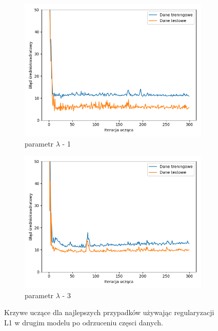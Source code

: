 \documentclass[12pt]{aghdpl}
\begin{document}
\begin{figure}[h]
		 	\begin{subfigure}{.5\linewidth}
		 		\includegraphics[width =\linewidth]{wykresy/7_badanie_danych/l1/regularyzacja_1_wykres_uczenia.png}
		 		\caption{parametr $\lambda$ - 1}
		 	\end{subfigure}
		 	\begin{subfigure}{.5\linewidth}
		 		\includegraphics[width =\linewidth]{wykresy/7_badanie_danych/l1/regularyzacja_3_wykres_uczenia.png}
		 		\caption{parametr $\lambda$ - 3}
		 	\end{subfigure}
		  	
		  	\caption{Krzywe uczące dla najlepszych przypadków używając regularyzacji L1 w drugim modelu po odrzuceniu częsci danych.}
			\label{fig: drugi_model_przy_regularyzacji_l1_po_odrzuceniu_czesci_danych_wykresy_uczenia}
		\end{figure}
		 	
\end{document}
